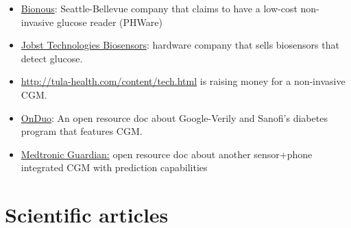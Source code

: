 \documentclass[
]{book}
\providecommand{\tightlist}{%
  \setlength{\itemsep}{0pt}\setlength{\parskip}{0pt}}
\begin{document}
\begin{itemize}
\tightlist
\item
  \href{http://phware.com/Views/About.aspx}{Bionous}: Seattle-Bellevue company that claims to have a low-cost non-invasive glucose reader (PHWare)
\item
  \href{https://www.jobst-technologies.com/products/biosensors/}{Jobst Technologies Biosensors}: hardware company that sells biosensors that detect glucose.
\item
  \url{http://tula-health.com/content/tech.html} is raising money for a non-invasive CGM.
\item
  \href{https://docs.google.com/document/d/1ZyKx4_gGdBMYBQK0o32ftELf5tiShxAFo6mg1rph16U/edit\#}{OnDuo}: An open resource doc about Google-Verily and Sanofi's diabetes program that features CGM.
\item
  \href{https://docs.google.com/document/d/1sqmioRvVTh8XsljrLYUplDPhaTeehrJck0khOe6D-gI/edit\#}{Medtronic Guardian:} open resource doc about another sensor+phone integrated CGM with prediction capabilities
\end{itemize}

\hypertarget{scientific-articles}{%
\section{Scientific articles}\label{scientific-articles}}
\end{document}
